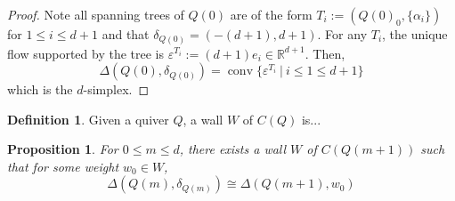 \documentclass[11pt]{amsart}
\theoremstyle{plain}
\newtheorem{proposition}[theorem]{Proposition}
\theoremstyle{definition}
\newtheorem{definition}[theorem]{Definition}
\newcommand{\R}{\mathbb{R}}
\DeclareMathOperator{\conv}{conv}
\begin{document}
\begin{proof}
    Note all spanning trees of $Q(0)$ are of the form $T_i := (Q(0)_0, \{\alpha_i\})$ for $1 \leq i \leq d + 1$ and that $\delta_{Q(0)} = (-(d + 1), d + 1)$. For any $T_i$,  the unique flow supported by the tree is $\varepsilon^{T_i} := (d + 1)e_i \in \R^{d+1}$. Then,
    \[
    \Delta(Q(0), \delta_{Q(0)}) = \conv\{\varepsilon^{T_i} \:|\: i \leq 1 \leq d + 1\}
    \]
    \noindent which is the $d$-simplex.
\end{proof}

\begin{definition}
    Given a quiver $Q$, a wall $W$ of $C(Q)$ is...
\end{definition}

\begin{proposition} \label{wall-existence}
    For $0 \leq m \leq d$, there exists a wall $W$ of $C(Q(m + 1))$ such that for some weight $w_0 \in W$, 
    \[
        \Delta(Q(m), \delta_{Q(m)}) \cong \Delta(Q(m+1), w_0)
    \]
\end{proposition}
\end{document}
